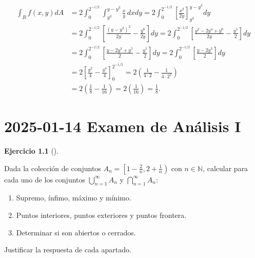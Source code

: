 \documentclass[
  spanish,
  a4paper,
]{scrreport}
\providecommand{\tightlist}{%
  \setlength{\itemsep}{0pt}\setlength{\parskip}{0pt}}
\theoremstyle{definition}
\newtheorem{exercise}{Ejercicio}[chapter]
\theoremstyle{remark}
\begin{document}
\begin{tcolorbox}
\begin{align*}
\int_R f(x,y) dA 
&= 2\int_0^{2^{-1/2}} \int_{y^3}^{y-y^3} \frac{x}{y} \,dx dy 
= 2\int_0^{2^{-1/2}} \left[ \frac{x^2}{2y} \right]_{y^3}^{y-y^3} dy \\
&= 2\int_0^{2^{-1/2}} \left[ \frac{(y-y^3)^2}{2y} - \frac{y^6}{2y} \right] dy 
= 2\int_0^{2^{-1/2}} \left[ \frac{y^2-2y^4+y^6}{2y} - \frac{y^5}{2} \right] dy \\
&= 2\int_0^{2^{-1/2}} \left[ \frac{y-2y^3+y^5}{2} - \frac{y^5}{2} \right] dy 
= 2\int_0^{2^{-1/2}} \left[ \frac{y-2y^3}{2} \right] dy \\
&= 2\left[ \frac{y^2}{4} - \frac{y^4}{4} \right]_0^{2^{-1/2}} 
= 2\left( \frac{1}{4\cdot 2} - \frac{1}{4\cdot 2^2}  \right) \\
&= 2\left( \frac{1}{8} - \frac{1}{16} \right) 
= 2\left( \frac{1}{16} \right) 
= \frac{1}{8}.
\end{align*}

\end{tcolorbox}


\chapter{\texorpdfstring{2025-01-14 Examen de Análisis
I}{2025-01-14  Examen de Análisis I}}\label{examen-de-anuxe1lisis-i-5}

\begin{exercise}[]\protect\hypertarget{exr-1}{}\label{exr-1}

Dada la colección de conjuntos
\(A_n = \left[1-\frac{2}{n}, 2+\frac{1}{n}\right)\) con
\(n \in \mathbb{N}\), calcular para cada uno de los conjuntos
\(\bigcup_{n=1}^{\infty} A_n\) y \(\bigcap_{n=1}^{\infty} A_n\):

\begin{enumerate}
\def\labelenumi{\alph{enumi}.}
\tightlist
\item
  Supremo, ínfimo, máximo y mínimo.
\item
  Puntos interiores, puntos exteriores y puntos frontera.
\item
  Determinar si son abiertos o cerrados.
\end{enumerate}

Justificar la respuesta de cada apartado.

\end{exercise}
\end{document}
